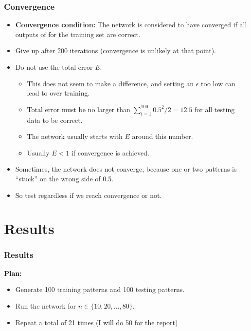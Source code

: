 \documentclass{beamer}
\numberwithin{equation}{section} %
\begin{document}
\begin{frame}
    \frametitle{Convergence}
    \begin{itemize}
        \item \textbf{Convergence condition: } The network is considered to have converged if all outputs of for the training set are correct.
        \pause
        \item Give up after 200 iterations (convergence is unlikely at that point).
        \pause
        \item Do not use the total error $E$.
        \pause
        \begin{itemize}
            \item This does not seem to make a difference, and setting an $\epsilon$ too low can lead to over training.
            \pause
            \item Total error must be no larger than $\sum_{i=1}^{100}{0.5^2}/2=12.5$ for all testing data to be correct.
            \pause
            \item The network usually starts with $E$ around this number.
            \pause
            \item Usually $E < 1$ if convergence is achieved.
        \end{itemize}
        \pause
        \item Sometimes, the network does not converge, because one or two patterns is ``stuck'' on the wrong side of 0.5.
        \pause
        \item So test regardless if we reach convergence or not.
    \end{itemize}
\end{frame}

\section{Results}

\begin{frame}
    \frametitle{Results}
    \textbf{Plan:}
    \begin{itemize}
        \item Generate 100 training patterns and 100 testing patterns.
        \pause
        \item Run the network for $n\in \{10, 20, \ldots, 80\}$.
        \pause
        \item Repeat a total of 21 times (I will do 50 for the report)
    \end{itemize}
\end{frame}
\end{document}

